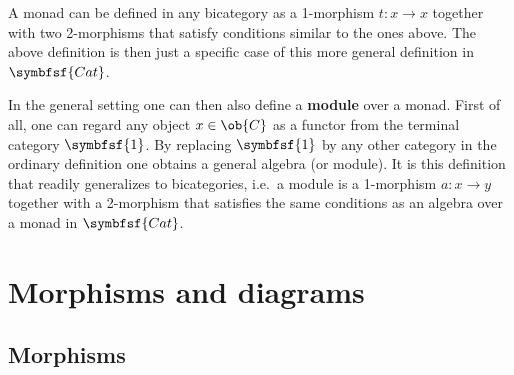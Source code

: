     \begin{remark}
        A monad can be defined in any bicategory as a 1-morphism $t:x\rightarrow x$ together with two 2-morphisms that satisfy conditions similar to the ones above. The above definition is then just a specific case of this more general definition in $\symbfsf{Cat}$.

        In the general setting one can then also define a \textbf{module} over a monad. First of all, one can regard any object $x\in\ob{C}$ as a functor from the terminal category $\symbfsf{1}$. By replacing $\symbfsf{1}$ by any other category in the ordinary definition one obtains a general algebra (or module). It is this definition that readily generalizes to bicategories, i.e.~a module is a 1-morphism $a:x\rightarrow y$ together with a 2-morphism that satisfies the same conditions as an algebra over a monad in $\symbfsf{Cat}$.
    \end{remark}

\section{Morphisms and diagrams}\label{section:morphisms}
\subsection{Morphisms}



